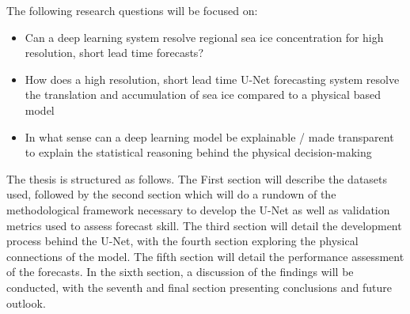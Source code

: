 \documentclass[../main/thesis.tex]{subfiles}
\begin{document}
The following research questions will be focused on: 
\begin{itemize}
    \item Can a deep learning system resolve regional sea ice concentration for high resolution, short lead time forecasts? 
    \item How does a high resolution, short lead time U-Net forecasting system resolve the translation and accumulation of sea ice compared to a physical based model
    \item  In what sense can a deep learning model be explainable / made transparent to explain the statistical reasoning behind the physical decision-making
\end{itemize}

The thesis is structured as follows. The First section will describe the datasets used, followed by the second section which will do a rundown of the methodological framework necessary to develop the U-Net as well as validation metrics used to assess forecast skill. The third section will detail the development process behind the U-Net, with the fourth section exploring the physical connections of the model. The fifth section will detail the performance assessment of the forecasts. In the sixth section, a discussion of the findings will be conducted, with the seventh and final section presenting conclusions and future outlook. 



\biblio
\end{document}
